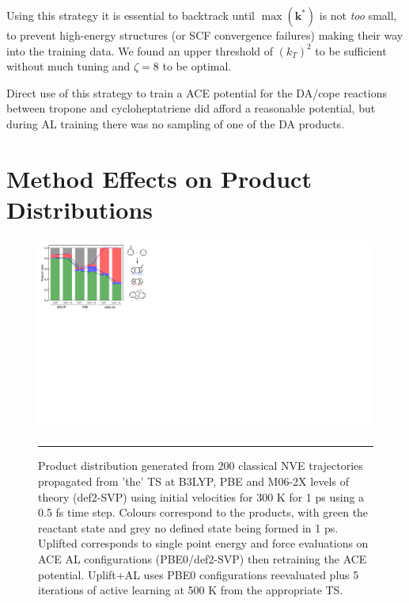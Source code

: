 \documentclass[11pt]{article}
\numberwithin{equation}{subsection}
\begin{document}
Using this strategy it is essential to backtrack until $\max(\boldsymbol{k}^*)$ is not \emph{too} small, to prevent high-energy structures (or SCF convergence failures) making their way into the training data. We found an upper threshold of $(k_T)^2$ to be sufficient without much tuning and $\zeta = 8$ to be optimal.


Direct use of this strategy to train a ACE potential for the DA/cope reactions between tropone and cycloheptatriene did afford a reasonable potential, but during AL training there was no sampling of one of the DA products.





\newpage
\section{Method Effects on Product Distributions}


\begin{figure}[h!]
	\centering
	\vspace{0.4cm}
	\includegraphics[height=6.4cm]{figSX31.pdf}
	\vspace{0.1cm}
	\hrule
	\vspace{0.1cm}
	\caption{Product distribution generated from 200 classical NVE trajectories propagated from 'the' TS at B3LYP, PBE and M06-2X levels of theory (def2-SVP) using initial velocities for 300 K for 1 ps using a 0.5 fs time step. Colours correspond to the products, with green the reactant state and grey no defined state being formed in 1 ps. Uplifted corresponds to single point energy and force evaluations on ACE AL configurations (PBE0/def2-SVP) then retraining the ACE potential. Uplift+AL uses PBE0 configurations reevaluated plus 5 iterations of active learning at 500 K from the appropriate TS.
}
	\label{fig::SX31}
\end{figure}




\clearpage
\printbibliography
\end{document}
